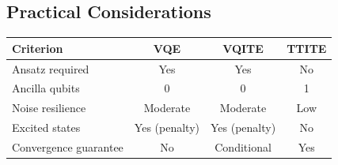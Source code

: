 \documentclass[11pt,a4paper]{article}
\begin{document}
\subsection{Practical Considerations}

\begin{center}
\begin{tabular}{@{}l c c c@{}}
\toprule
Criterion & VQE & VQITE & TTITE \\
\midrule
Ansatz required & Yes & Yes & No \\
Ancilla qubits & 0 & 0 & 1 \\
Noise resilience & Moderate & Moderate & Low \\
Excited states & Yes (penalty) & Yes (penalty) & No \\
Convergence guarantee & No & Conditional & Yes \\
\bottomrule
\end{tabular}
\end{center}
\end{document}
